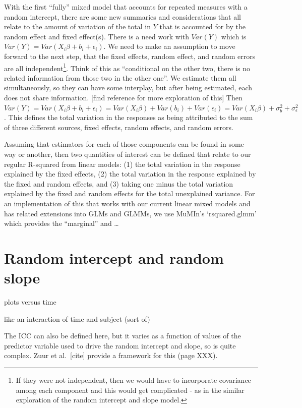 \documentclass[
]{book}
\begin{document}
With the first ``fully'' mixed model that accounts for repeated measures with a random intercept, there are some new summaries and considerations that all relate to the amount of variation of the total in \(Y\) that is accounted for by the random effect and fixed effect(s). There is a need work with \(Var(Y)\) which is \(Var(Y) = Var(X_i\beta + b_i + \epsilon_i)\). We need to make an assumption to move forward to the next step, that the fixed effects, random effect, and random errors are all independent\footnote{If they were not independent, then we would have to incorporate covariance among each component and this would get complicated - as in the similar exploration of the random intercept and slope model.}. Think of this as ``conditional on the other two, there is no related information from those two in the other one''. We estimate them all simultaneously, so they can have some interplay, but after being estimated, each does not share information. {[}find reference for more exploration of this{]} Then \(Var(Y) = Var(X_i\beta + b_i + \epsilon_i) = Var(X_i\beta) + Var(b_i) + Var(\epsilon_i) = Var(X_i\beta) + \sigma^2_b + \sigma^2_\epsilon\). This defines the total variation in the responses as being attributed to the sum of three different sources, fixed effects, random effects, and random errors.

Assuming that estimators for each of those components can be found in some way or another, then two quantities of interest can be defined that relate to our regular R-squared from linear models: (1) the total variation in the response explained by the fixed effects, (2) the total variation in the response explained by the fixed and random effects, and (3) taking one minus the total variation explained by the fixed and random effects for the total unexplained variance. For an implementation of this that works with our current linear mixed models and has related extensions into GLMs and GLMMs, we use MuMIn's `rsquared.glmm' which provides the ``marginal'' and \ldots{}

\hypertarget{section7-5}{%
\section{Random intercept and random slope}\label{section7-5}}

plots versus time

like an interaction of time and subject (sort of)

The ICC can also be defined here, but it varies as a function of values of the predictor variable used to drive the random intercept and slope, so is quite complex. Zuur et al.~{[}cite{]} provide a framework for this (page XXX).
\end{document}
